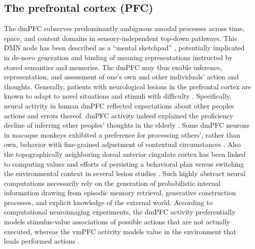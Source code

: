 \documentclass[10pt,letterpaper]{article}
\begin{document}
\subsection{The prefrontal cortex (PFC)}
The dmPFC subserves predominantly ambiguous amodal processes
across time, space, and content domains in
sensory-independent top-down pathways.
This DMN node has been described as a “mental sketchpad”
\citep{goldman1996prefrontal},
potentially implicated in de-novo generation and binding
of meaning representations instructed by stored semantics and memories.
%
The dmPFC may thus enable inference, representation, and assessment
of one's own and other individuals' action and thoughts.
Generally,
patients with neurological lesions in the prefrontal cortex
are known to adapt to novel situations and stimuli with difficulty
\citep{stuss1986frontal}.
Specifically, neural activity in human dmPFC
reflected expectations about other peoples actions and errors thereof.
dmPFC activity indeed explained the proficiency decline
of inferring other peoples' thoughts in the elderly \citep{moran2012social}.
Some dmPFC neurons in macaque monkeys exhibited a preference
for processing others', rather than own, behavior
with fine-grained adjustment of contextual circumstances \citep{yoshida2010neural}.
Also the topographically neighboring dorsal anterior cingulate cortex
has been linked to computing values and efforts of
persisting a behavioral plan versus switching the
environmental context in several lesion studies \citep{kolling2016value}.
%
Such highly abstract neural computations necessarily rely on the
generation of probabilistic internal information drawing from
episodic memory retrieval, generative construction processes,
and explicit knowledge of the external world.
%
According to computational neuroimaging experiments,
the dmPFC activity preferentially models stimulus-value associations of
possible actions that are not actually executed,
whereas the vmPFC activity models value in the environment that leads performed actions
\citep{nicolle2012agent}.
\end{document}
